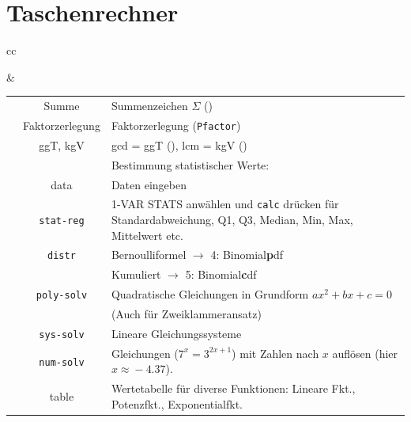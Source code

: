 \newpage
\keinHeaderUndKeinFooter{}

\section*{Taschenrechner}

\begin{tabular}{cc}


&

\begin{tabular}{c|c|p{80mm}}\hline
\tiprobutton{math}         &Summe             & Summenzeichen $\Sigma$ (\tiprobutton{5})\\
                           &Faktorzerlegung   & Faktorzerlegung (\tiprobutton{4}\texttt{Pfactor})\\
                           & ggT, kgV         & gcd = ggT
(\tiprobutton{3}), lcm = kgV (\tiprobutton{2})\\\hline
                           &                  & Bestimmung statistischer Werte:\\
\tiprobutton{data}         & data             & Daten eingeben\\
                           &\texttt{stat-reg} & 1-VAR STATS anwählen
und \texttt{calc} drücken für Standardabweichung, Q1, Q3, Median, Min,
Max, Mittelwert etc.\\
                           &\texttt{distr}    & Bernoulliformel $\rightarrow$ 4: Binomial\textbf{p}df\\
                           &                  & Kumuliert $\rightarrow$ 5: Binomial\textbf{c}df\\\hline
\tiprobutton{cos_poly-solv}&\texttt{poly-solv}&  Quadratische Gleichungen in Grundform $ax^2+bx+c=0$\\
                           &                  &  (Auch für Zweiklammeransatz)\\\hline
\tiprobutton{tan_sys-solv} &\texttt{sys-solv} &  Lineare Gleichungssysteme\\\hline
\tiprobutton{sin_num-solv} &\texttt{num-solv} &  Gleichungen ($7^x=3^{2x+1}$) mit Zahlen nach $x$ auf\/lösen (hier $x\approx{}-4.37$).\\\hline
\tiprobutton{table}        & table            &  Wertetabelle für diverse Funktionen: Lineare Fkt., Potenzfkt., Exponentialfkt.\\\hline

\end{tabular}
\end{tabular}
